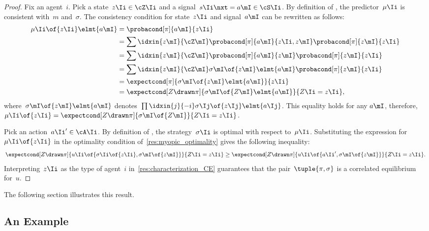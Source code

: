\begin{proof}
Fix an agent~\(i\).
Pick a state~\(z\Ii \in \cZ\Ii\) and a signal~\(s\Ii\nxt = a\mI \in \cS\Ii\).
By definition of , the predictor~\(\mu\Ii\) is consistent with~\(m\) and~\(\sigma\).
The consistency condition for state~\(z\Ii\) and signal~\(a\mI\) can be rewritten as follows:
\begin{align*}
\mu\Ii \of{z\Ii} \elmt{a\mI}
&= \probacond[\pi]{a\mI}{z\Ii} \\
&= \sum\idxin{z\mI}{\cZ\mI} \probacond[\pi]{a\mI}{z\Ii, z\mI} \probacond[\pi]{z\mI}{z\Ii} \\
&= \sum\idxin{z\mI}{\cZ\mI} \probacond[\pi]{a\mI}{z\mI} \probacond[\pi]{z\mI}{z\Ii} \\
&= \sum\idxin{z\mI}{\cZ\mI} \sigma\mI \of{z\mI} \elmt{a\mI} \probacond[\pi]{z\mI}{z\Ii} \\
&= \expectcond[\pi]{\sigma\mI \of{z\mI} \elmt{a\mI}}{z\Ii} \\
&= \expectcond[Z \drawn \pi]{\sigma\mI \of{Z\mI} \elmt{a\mI}}{Z\Ii = z\Ii}
,
\end{align*}
where~\(\sigma\mI \of{z\mI} \elmt{a\mI}\) denotes~\(\prod\idxin{j}{-i} \sigma\Ij \of{z\Ij} \elmt{a\Ij}\).
This equality holds for any \(a\mI\), therefore, ~\(\mu\Ii \of{z\Ii} = \expectcond[Z \drawn \pi]{\sigma\mI \of{Z\mI}}{Z\Ii = z\Ii}\).

Pick an action~\(a\Ii' \in \cA\Ii\).
By definition of , the strategy~\(\sigma\Ii\) is optimal with respect to~\(\mu\Ii\).
Substituting the expression for~\(\mu\Ii \of{z\Ii}\) in the optimality condition of~\cref{res:myopic_optimality} gives the following inequality:
\[
\expectcond[Z \drawn \pi]{u\Ii \of{\sigma\Ii \of{z\Ii}, \sigma\mI \of{z\mI}}}{Z\Ii = z\Ii}
\ge
\expectcond[Z \drawn \pi]{u\Ii \of{a\Ii', \sigma\mI \of{z\mI}}}{Z\Ii = z\Ii}
.
\]
Interpreting~\(z\Ii\) as the type of agent~\(i\) in~\cref{res:characterization_CE} guarantees that the pair~\(\tuple{\pi, \sigma}\) is a correlated equilibrium for~\(u\).
\end{proof}

The following section illustrates this result.

\subsection{An Example}

